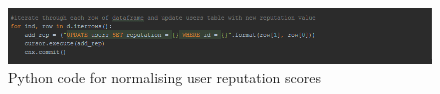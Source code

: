 \begin{figure}[H]
\centering
\includegraphics[width=\linewidth]{Images/Implementation/UserRepPython2}
\caption{Python code for normalising user reputation scores}
\label{fig:UserRepPython2}
\end{figure}